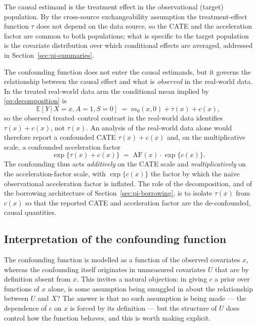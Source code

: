 \documentclass[11pt]{report}
\theoremstyle{plain}
\theoremstyle{definition}
\theoremstyle{remark}
\newcommand{\E}{\mathbb{E}}
\newcommand{\1}{\mathds{1}}
\theoremstyle{plain}
\theoremstyle{remark}
\newcommand{\given}{\,\vert\,}
\newcommand{\af}{\mathrm{AF}}
\begin{document}
The causal estimand is the treatment effect in the observational (target)
population. By the cross-source exchangeability assumption the treatment-effect
function $\tau$ does not depend on the data source, so the CATE and the
acceleration factor are common to both populations; what is specific to the
target population is the covariate distribution over which conditional effects
are averaged, addressed in Section~\ref{sec:pi-summaries}.

The confounding function does not enter the causal estimands, but it governs
the relationship between the causal effect and what is \emph{observed} in the
real-world data. In the treated real-world data arm the conditional mean
implied by \eqref{eq:decomposition} is
\[
\E[Y \given X = x, A = 1, S = 0] \;=\; m_0(x, 0) + \tau(x) + c(x),
\]
so the observed treated--control contrast in the real-world data identifies
$\tau(x) + c(x)$, not $\tau(x)$. An analysis of the real-world data alone
would therefore report a confounded CATE $\tau(x) + c(x)$ and, on the
multiplicative scale, a confounded acceleration factor
\[
\exp\{\tau(x) + c(x)\} \;=\; \af(x)\cdot\exp\{c(x)\}.
\]
The confounding thus acts \emph{additively} on the CATE scale and
\emph{multiplicatively} on the acceleration-factor scale, with $\exp\{c(x)\}$
the factor by which the naive observational acceleration factor is inflated. The
role of the decomposition, and of the borrowing architecture of
Section~\ref{sec:pi-borrowing}, is to isolate $\tau(x)$ from $c(x)$ so that the
reported CATE and acceleration factor are the de-confounded, causal quantities.

\subsection{Interpretation of the confounding function}
\label{subsec:c-interpret}

The confounding function is modelled as a function of the observed covariates
$x$, whereas the confounding itself originates in unmeasured covariates $U$ that
are by definition absent from $x$. This invites a natural objection: in giving
$c$ a prior over functions of $x$ alone, is some assumption being smuggled in
about the relationship between $U$ and $X$? The answer is that no such
assumption is being made --- the dependence of $c$ on $x$ is forced by its
definition --- but the structure of $U$ does control how the function behaves,
and this is worth making explicit.
\end{document}
